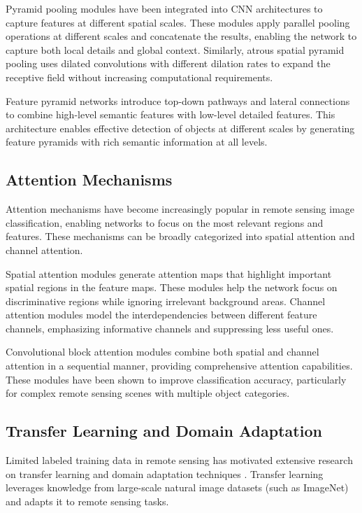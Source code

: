\documentclass[12pt,a4paper]{article}
\begin{document}
Pyramid pooling modules have been integrated into CNN architectures to capture features at different spatial scales. These modules apply parallel pooling operations at different scales and concatenate the results, enabling the network to capture both local details and global context. Similarly, atrous spatial pyramid pooling uses dilated convolutions with different dilation rates to expand the receptive field without increasing computational requirements.

Feature pyramid networks introduce top-down pathways and lateral connections to combine high-level semantic features with low-level detailed features. This architecture enables effective detection of objects at different scales by generating feature pyramids with rich semantic information at all levels.

\subsection{Attention Mechanisms}
Attention mechanisms have become increasingly popular in remote sensing image classification, enabling networks to focus on the most relevant regions and features. These mechanisms can be broadly categorized into spatial attention and channel attention.

Spatial attention modules generate attention maps that highlight important spatial regions in the feature maps. These modules help the network focus on discriminative regions while ignoring irrelevant background areas. Channel attention modules model the interdependencies between different feature channels, emphasizing informative channels and suppressing less useful ones.

Convolutional block attention modules combine both spatial and channel attention in a sequential manner, providing comprehensive attention capabilities. These modules have been shown to improve classification accuracy, particularly for complex remote sensing scenes with multiple object categories.

\subsection{Transfer Learning and Domain Adaptation}
Limited labeled training data in remote sensing has motivated extensive research on transfer learning and domain adaptation techniques \cite{zhu2017deep}. Transfer learning leverages knowledge from large-scale natural image datasets (such as ImageNet) and adapts it to remote sensing tasks.
\end{document}
